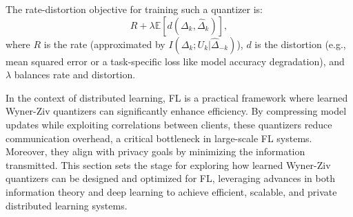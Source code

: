 The rate-distortion objective for training such a quantizer is:
\begin{equation}
    R + \lambda \mathbb{E}[d(\Delta_k, \hat{\Delta}_k)],
\end{equation}
where $R$ is the rate (approximated by $I(\Delta_k; U_k|\hat{\Delta}_{-k})$), $d$ is the distortion (e.g., mean squared error or a task-specific loss like model accuracy degradation), and $\lambda$ balances rate and distortion.

In the context of distributed learning, FL is a practical framework where learned Wyner-Ziv quantizers can significantly enhance efficiency. By compressing model updates while exploiting correlations between clients, these quantizers reduce communication overhead, a critical bottleneck in large-scale FL systems. Moreover, they align with privacy goals by minimizing the information transmitted. This section sets the stage for exploring how learned Wyner-Ziv quantizers can be designed and optimized for FL, leveraging advances in both information theory and deep learning to achieve efficient, scalable, and private distributed learning systems.

